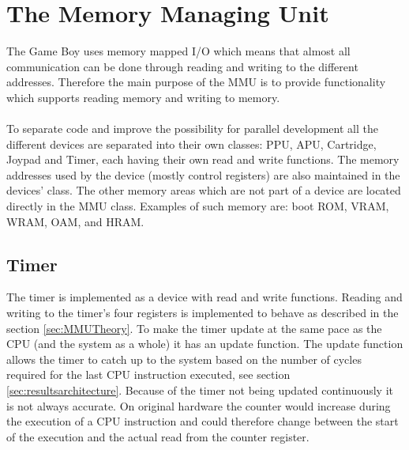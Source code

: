 
\section{The Memory Managing Unit}
The Game Boy uses memory mapped I/O which means that almost all communication can be done through reading and writing to the different addresses. Therefore the main purpose of the MMU is to provide functionality which supports reading memory and writing to memory. 
\\\\
To separate code and improve the possibility for parallel development all the different devices are separated into their own classes: PPU, APU, Cartridge, Joypad and Timer, each having their own read and write functions. 
The memory addresses used by the device (mostly control registers) are also maintained in the devices' class. 
The other memory areas which are not part of a device are located directly in the MMU class. Examples of such memory are: boot ROM, VRAM, WRAM, OAM, and HRAM.

\subsection{Timer}

The timer is implemented as a device with read and write functions. 
Reading and writing to the timer's four registers is implemented to behave as described in the section \ref{sec:MMUTheory}.  
To make the timer update at the same pace as the CPU (and the system as a whole) it has an update function. 
The update function allows the timer to catch up to the system based on the number of cycles required for the last CPU instruction executed, see section \ref{sec:resultsarchitecture}.
Because of the timer not being updated continuously it is not always accurate. On original hardware the counter would increase during the execution of a CPU instruction and could therefore change between the start of the execution and the actual read from the counter register.



